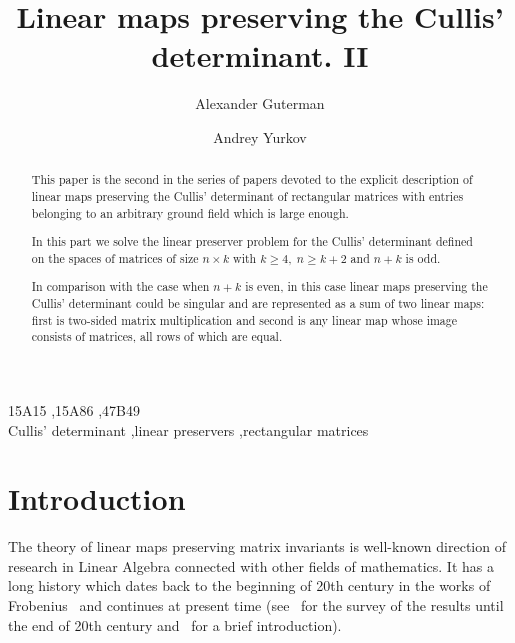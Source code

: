 \documentclass{elsarticle}
\theoremstyle{plain}
\theoremstyle{definition}
\numberwithin{equation}{section}
\begin{document}
\title{Linear maps preserving the Cullis'
determinant. II}
\author{Alexander Guterman}
\author{Andrey Yurkov}


\begin{keyword}
\MSC[2020] 15A15 \sep 15A86 \sep 47B49\\
Cullis' determinant \sep linear preservers \sep rectangular matrices    
\end{keyword}

\begin{abstract}
This paper is the second in the series of papers devoted to the explicit description of linear maps preserving the Cullis' determinant of rectangular matrices with entries belonging to an arbitrary ground field which is large enough.

In this part we solve the linear preserver problem for the Cullis' determinant defined on the spaces of matrices of size $n\times k$ with $k \ge 4,\; n \ge k + 2$ and $n + k$ is odd. 

In comparison with the case when $n + k$ is even, in this case linear maps preserving the Cullis' determinant could be singular and are represented as a sum of two linear maps: first is two-sided matrix multiplication and second is any linear map whose image consists of matrices, all rows of which are equal.
\end{abstract}



\maketitle



\section{Introduction}
The theory of linear maps preserving matrix invariants is well-known direction of research in Linear Algebra connected with other fields of mathematics. It has a long history which dates back to the beginning of 20th century in the works of Frobenius~\cite{GF} and continues at present time (see~\cite{LAMA199233} for the survey of the results until the end of 20th century and~\cite{hogben_handbook_2014} for a brief introduction).
\end{document}
